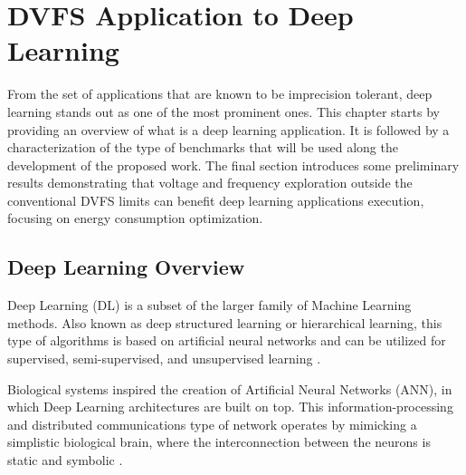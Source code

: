 


\chapter{DVFS Application to Deep Learning}
\label{chapter:application}

From the set of applications that are known to be imprecision tolerant, deep learning stands out as one of the most prominent ones. This chapter starts by providing an overview of what is a deep learning application. It is followed by a characterization of the type of benchmarks that will be used along the development of the proposed work. The final section introduces some preliminary results demonstrating that voltage and frequency exploration outside the conventional DVFS limits can benefit deep learning applications execution, focusing on energy consumption optimization.

\section{Deep Learning Overview}
\label{sec:DLO}
Deep Learning (DL) is a subset of the larger family of Machine Learning methods. Also known as deep structured learning or hierarchical learning, this type of algorithms is based on artificial neural networks and can be utilized for supervised, semi-supervised, and unsupervised learning \cite{bengio_representation_2013} \cite{schmidhuber_deep_2015}.

Biological systems inspired the creation of Artificial Neural Networks (ANN), in which Deep Learning architectures are built on top. This information-processing and distributed communications type of network operates by mimicking a simplistic biological brain, where the interconnection between the neurons is static and symbolic \cite{marblestone_toward_2016}. 


